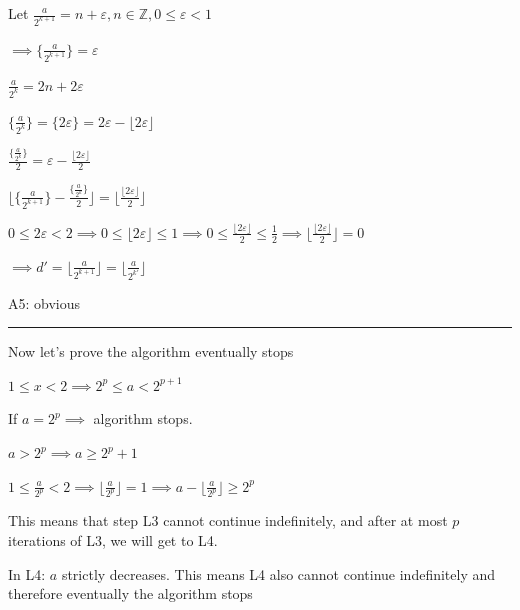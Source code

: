 \documentclass{article}
\begin{document}
Let \( \frac{a}{2^{k+1}} = n + \varepsilon, n \in \mathbb{Z}, 0 \leq \varepsilon < 1 \)

\( \implies \{\frac{a}{2^{k+1}}\} = \varepsilon \)

\( \frac{a}{2^k} = 2n + 2\varepsilon \)

\( \{\frac{a}{2^k}\} = \{ 2\varepsilon \} = 2\varepsilon - \lfloor2\varepsilon\rfloor \)

\( \frac{\{\frac{a}{2^k}\}}{2} = \varepsilon - \frac{\lfloor2 \varepsilon\rfloor}{2} \)

\( \lfloor \{\frac{a}{2^{k+1}}\} - \frac{\{\frac{a}{2^k}\}}{2}\rfloor = \lfloor\frac{\lfloor2\varepsilon\rfloor}{2}\rfloor \)

\( 0 \leq 2\varepsilon < 2 \implies 0 \leq \lfloor2\varepsilon\rfloor \leq 1 \implies 0 \leq \frac{\lfloor2\varepsilon\rfloor}{2} \leq \frac{1}{2} \implies \lfloor\frac{\lfloor2\varepsilon\rfloor}{2}\rfloor = 0 \)

\( \implies d' = \lfloor\frac{a}{2^{k+1}}\rfloor = \lfloor\frac{a}{2^{k'}}\rfloor \)

A5: obvious

\bigskip\hrule\bigskip

Now let's prove the algorithm eventually stops

\( 1 \leq x < 2 \implies 2^p \leq a < 2^{p+1} \)

If \( a = 2^p \implies \) algorithm stops.

\( a > 2^p \implies a \geq 2^p + 1 \)

\( 1 \leq \frac{a}{2^p} < 2 \implies \lfloor\frac{a}{2^p}\rfloor = 1 \implies a - \lfloor\frac{a}{2^p}\rfloor \geq 2^p \)

This means that step L3 cannot continue indefinitely, and after at most \( p \) iterations of L3, we will get to L4.

In L4: \( a \) strictly decreases. This means L4 also cannot continue indefinitely and therefore eventually the algorithm stops
\end{document}
